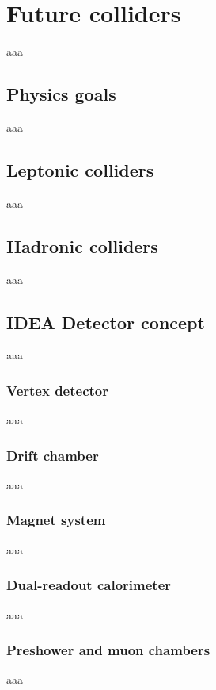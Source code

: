 \chapter{Future colliders}
aaa

\section{Physics goals}
aaa

\section{Leptonic colliders}
aaa

\section{Hadronic colliders}
aaa

\section{IDEA Detector concept} \label{chap:Idea_project}
aaa

\subsection{Vertex detector}
aaa

\subsection{Drift chamber}
aaa

\subsection{Magnet system}
aaa

\subsection{Dual-readout calorimeter}
aaa

\subsection{Preshower and muon chambers}
aaa